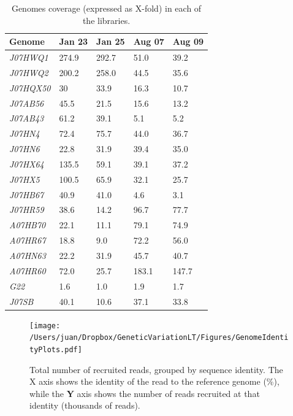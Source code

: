 \begin{table}[ht!]
  \caption{Genomes coverage (expressed as X-fold) in each of the libraries.}
  \begin{tabularx}{\textwidth}{L{2.2cm}R{2cm}R{3cm}R{3.2cm}R{2cm}}
  \hline
    \textbf{Genome} & \textbf{Jan 23} & \textbf{Jan 25} & \textbf{Aug 07} & \textbf{Aug 09} \\
    \hline
     \textit{J07HWQ1} & 274.9 & 292.7 & 51.0 & 39.2 \\
     \textit{J07HWQ2} & 200.2 & 258.0 & 44.5 & 35.6 \\
     \textit{J07HQX50} & 30 & 33.9 & 16.3 & 10.7 \\
     \textit{J07AB56} & 45.5 & 21.5 & 15.6 & 13.2 \\
     \textit{J07AB43} & 61.2 & 39.1 & 5.1 & 5.2 \\
     \textit{J07HN4} & 72.4 & 75.7 & 44.0 & 36.7 \\
     \textit{J07HN6} & 22.8 & 31.9 & 39.4 & 35.0 \\
     \textit{J07HX64} & 135.5 & 59.1 & 39.1 & 37.2 \\
     \textit{J07HX5} & 100.5 & 65.9 & 32.1 & 25.7 \\
     \textit{J07HB67} & 40.9 & 41.0 & 4.6 & 3.1 \\
     \textit{J07HR59} & 38.6 & 14.2 & 96.7 & 77.7 \\
     \textit{A07HB70} & 22.1 & 11.1 & 79.1 & 74.9 \\
     \textit{A07HR67} & 18.8 & 9.0 & 72.2 & 56.0  \\
     \textit{A07HN63} & 22.2 & 31.9 & 45.7 & 40.7 \\
     \textit{A07HR60} & 72.0 & 25.7 & 183.1 & 147.7 \\
     \textit{G22} & 1.6 & 1.0 & 1.9 & 1.7 \\
     \textit{J07SB} & 40.1 & 10.6 & 37.1 & 33.8 \\     
  \end{tabularx}
  \label{ReadCoverageGenome}
\end{table}



\begin{figure}[!hbtp]
  \centering
  \texttt{[image: /Users/juan/Dropbox/GeneticVariationLT/Figures/GenomeIdentityPlots.pdf]}
  \caption{Total number of recruited reads, grouped by sequence identity. The X axis shows the identity of the read to the reference genome (\%), while the \textbf{Y} axis shows the number of reads recruited at that identity (thousands of reads).}
  \label{GenomeReadIdentity}
\end{figure}


